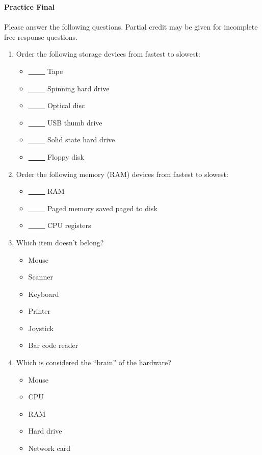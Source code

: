 \documentclass[letter,11pt]{article}
\begin{document}
\huge
\textbf{Practice Final}
\normalsize

\paragraph{}Please answer the following questions. Partial credit may be given for incomplete free response questions.

\begin{enumerate}
    \item Order the following storage devices from fastest to slowest:
    \begin{itemize}
        \item \underline{~~ ~~} Tape
        \item \underline{~~ ~~} Spinning hard drive
        \item \underline{~~ ~~} Optical disc
        \item \underline{~~ ~~} USB thumb drive
        \item \underline{~~ ~~} Solid state hard drive
        \item \underline{~~ ~~} Floppy disk
    \end{itemize}
    
    \item Order the following memory (RAM) devices from fastest to slowest:
    \begin{itemize}
        \item \underline{~~ ~~} RAM
        \item \underline{~~ ~~} Paged memory saved paged to disk
        \item \underline{~~ ~~} CPU registers
    \end{itemize}
    
    \item Which item doesn't belong?
    \begin{itemize}
        \item Mouse
        \item Scanner
        \item Keyboard
        \item Printer
        \item Joystick
        \item Bar code reader
    \end{itemize}
    
    \item Which is considered the ``brain'' of the hardware?
    \begin{itemize}
        \item Mouse
        \item CPU
        \item RAM
        \item Hard drive
        \item Network card
    \end{itemize}
    

\end{enumerate}
\end{document}
